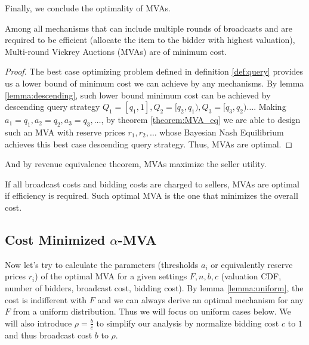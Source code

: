 Finally, we conclude the optimality of MVAs.

\begin{theorem}\label{theorem:MVA_eq}

Among all mechanisms that can include multiple rounds of broadcasts and are
required to be efficient (allocate the item to the bidder with highest
valuation), Multi-round Vickrey Auctions (MVAs) are of minimum cost.

\end{theorem}

\begin{proof}

The best case optimizing problem defined in definition \ref{def:query} provides
us a lower bound of minimum cost we can achieve by any mechanisms.  By lemma
\ref{lemma:descending}, such lower bound minimum cost can be achieved by descending query
strategy $Q_1 = [q_1, 1], Q_2 = [q_2, q_1), Q_3 = [q_3, q_2) \ldots$.  Making
$a_1 = q_1, a_2 = q_2, a_3 = q_3, \ldots$, by theorem \ref{theorem:MVA_eq} we
are able to design such an MVA with reserve prices $r_1, r_2, \ldots$  whose
Bayesian Nash Equilibrium achieves this best case descending query strategy.
Thus, MVAs are optimal.

\end{proof}

And by revenue equivalence theorem, MVAs maximize the seller utility.

\begin{corollary}

If all broadcast costs and bidding costs are charged to sellers, MVAs are
optimal if efficiency is required.  Such optimal MVA is the one that minimizes
the overall cost.

\end{corollary}

\subsection{Cost Minimized $\alpha$-MVA}\label{sec:alpha-MVA}

Now let's try to calculate the parameters (thresholds $a_i$ or equivalently
reserve prices $r_i$) of the optimal MVA for a given settings $F, n, b, c$
(valuation CDF, number of bidders, broadcast cost, bidding cost). By lemma
\ref{lemma:uniform}, the cost is indifferent with $F$ and we can always derive
an optimal mechanism for any $F$ from a uniform distribution. Thus we will
focus on uniform cases below. We will also introduce $\rho = \frac{b}{c}$ to
simplify our analysis by normalize bidding cost $c$ to $1$ and thus broadcast
cost $b$ to $\rho$.

